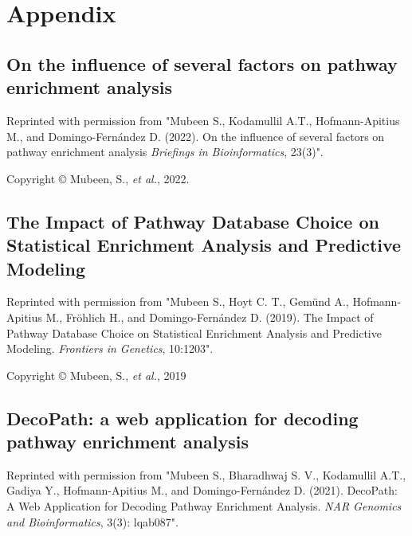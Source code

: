 \chapter{Appendix}


\section{On the influence of several factors on pathway enrichment analysis}
\label{ap:review}

\vspace*{1cm}

\noindent
Reprinted with permission from "Mubeen S., Kodamullil A.T., Hofmann-Apitius M., and Domingo-Fern\'{a}ndez D. (2022). On the influence of several factors on pathway enrichment analysis  \textit{Briefings in Bioinformatics}, 23(3)".

\noindent
Copyright © Mubeen, S., \textit{et al.}, 2022.





\section{The Impact of Pathway Database Choice on Statistical Enrichment Analysis and Predictive Modeling}
\label{ap:pathwayforte}

\vspace*{2cm}

\noindent
Reprinted with permission from "Mubeen S., Hoyt C. T., Gemünd A., Hofmann-Apitius M., Fröhlich H., and Domingo-Fern\'{a}ndez D. (2019). The Impact of Pathway Database Choice on Statistical Enrichment Analysis and Predictive Modeling. \textit{Frontiers in Genetics}, 10:1203".

\noindent
Copyright © Mubeen, S., \textit{et al.}, 2019





\section{DecoPath: a web application for decoding pathway enrichment analysis}
\label{ap:decopath}

\vspace*{2cm}

\noindent
Reprinted with permission from "Mubeen S., Bharadhwaj S. V., Kodamullil A.T., Gadiya Y., Hofmann-Apitius M., and Domingo-Fern\'{a}ndez D. (2021). DecoPath: A Web Application for Decoding Pathway Enrichment Analysis.  \textit{NAR Genomics and Bioinformatics}, 3(3): lqab087".

